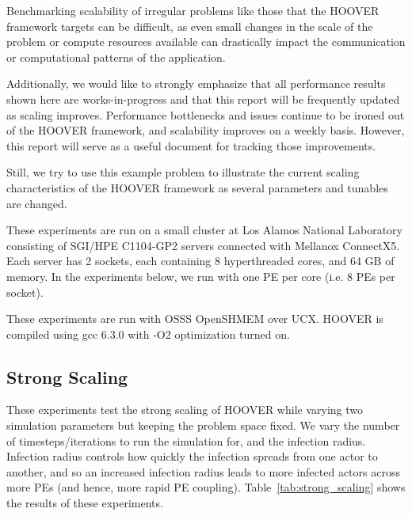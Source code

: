 Benchmarking scalability of irregular problems like those that the HOOVER
framework targets can be difficult, as even small changes in the scale of the
problem or compute resources available can drastically impact the communication
or computational patterns of the application.

Additionally, we would like to strongly emphasize that all performance results shown here
are works-in-progress and that this report will be frequently updated as scaling
improves. Performance bottlenecks and issues continue to be ironed
out of the HOOVER framework, and scalability improves on a weekly basis.
However, this report will serve as a useful document for tracking those
improvements.

Still, we try to use this example problem to illustrate the current scaling
characteristics of the HOOVER framework as several parameters and tunables are
changed.

These experiments are run on a small cluster at Los Alamos National Laboratory
consisting of SGI/HPE C1104-GP2 servers connected with Mellanox ConnectX5.
Each server has 2 sockets, each containing 8 hyperthreaded cores, and 64 GB of
memory. In the experiments below, we run with one PE per core (i.e. 8 PEs per
socket).

These experiments are run with OSSS OpenSHMEM over UCX. HOOVER is compiled using
gcc 6.3.0 with -O2 optimization turned on.

\subsection{Strong Scaling}
\label{sec:strong_scaling}

These experiments test the strong scaling of HOOVER while varying two
simulation parameters but keeping the problem space fixed. We vary the number of
timesteps/iterations to run the simulation for, and the infection radius.
Infection radius controls how quickly the infection spreads from one actor to
another, and so an increased infection radius leads to more infected actors
across more PEs (and hence, more rapid PE coupling).
Table~\ref{tab:strong_scaling} shows the results of these experiments.


